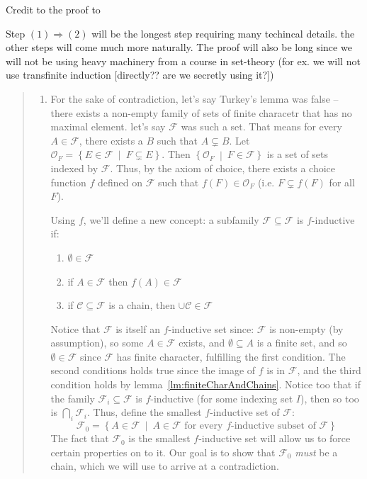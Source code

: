 \documentclass[oneside]{book}
\newcommand{\CC}{\mathcal{C}}
\newcommand{\CF}{\mathcal{F}}
\newcommand{\CO}{\mathcal{O}}
\newcommand{\ff}{\mathscr{F}}
\newcommand{\sse}{\subseteq}
\newcommand{\ssne}{\subsetneq}
\newcommand{\Rw}{\Rightarrow}
\newcommand{\set}[2]{\left\{#1 \ \middle|\ #2\right\}}
\begin{document}
Credit to the proof to %
\begin{Proof}
	Step $(1) \Rw (2)$ will be the longest step requiring many techincal details. the other steps will come much more
	naturally. The proof will also be long since we will not be using heavy machinery from a course in set-theory (for
	ex. we will not use transfinite induction [directly?? are we secretly using it?])
	\begin{quote}
		\begin{enumerate}
			\item[$(1) \Rw (2)$] For the sake of contradiction, let's say Turkey's lemma was false -- there exists
				a non-empty family of sets of finite characetr that has no maximal element. let's say $\CF$ was such
				a set. That means
				for every $A \in \CF$, there exists a $B$ such that $A \ssne B$. Let $\CO_F = \set{E \in \CF}{F \ssne
				E}$. Then $ \set{\CO_F}{F \in \CF}$ is a set of sets indexed by $\CF$. Thus, by the axiom of choice,
				there exists a choice function $f$ defined on $\CF$ such that $f(F) \in \CO_F$ (i.e. $F \ssne f(F)$ for
				all $F$).

				Using $f$, we'll define a new concept: a subfamily $\ff \sse \CF$ is $f$-inductive if:
				\begin{enumerate}
					\item $\emptyset \in \ff $
					\item if $A \in \ff$ then $f(A) \in \ff$
					\item if $\CC \sse \ff$ is a chain, then $\cup \CC \in \ff$
				\end{enumerate}

				Notice that $\CF$ is itself an $f$-inductive set since: $\CF$ is non-empty (by assumption), so some $A
				\in \CF$ exists, and
				$\emptyset \sse A$ is a finite set, and so $\emptyset \in \CF$ since $\CF$ has finite character,
				fulfilling the first condition. The
				second conditions holds true since the image of $f$ is in $\CF$, and the third condition holds by
				lemma~\ref{lm:finiteCharAndChains}. Notice too that if the family $\ff_i \sse \CF$ is $f$-inductive (for
				some indexing set $I$), then so too is $\bigcap_i \ff_i$. Thus, define the smallest $f$-inductive set of
				$\CF$:
				\[
					\ff_0 = \set{A \in \CF}{A \in \ff\text{ for every $f$-inductive subset of $\CF$}}
				\]
				The fact that $\ff_0$ is the smallest $f$-inductive set will allow us to force certain properties on to
				it. Our goal is to show that $\ff_0$ \emph{must} be a chain, which we will use to arrive at
				a contradiction.


\end{enumerate}
\end{quote}
\end{Proof}
\end{document}
